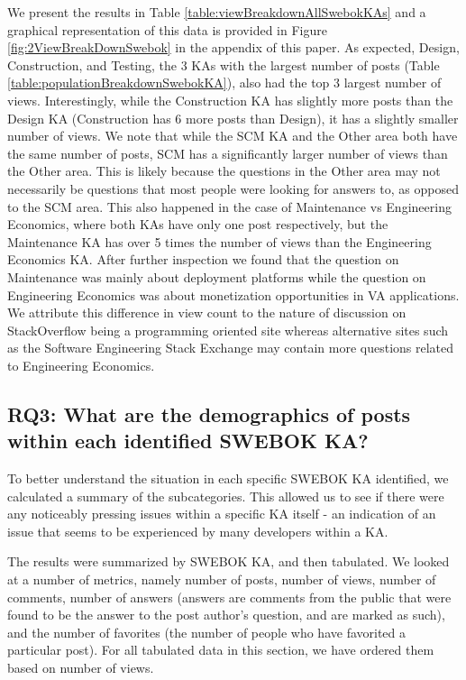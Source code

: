\documentclass{sigchi}
\begin{document}
We present the results in Table \ref{table:viewBreakdownAllSwebokKAs} and a graphical representation of this data is provided in Figure \ref{fig:2ViewBreakDownSwebok} in the appendix of this paper. As expected, Design, Construction, and Testing, the 3 KAs with the largest number of posts (Table \ref{table:populationBreakdownSwebokKA}), also had the top 3 largest number of views. Interestingly, while the Construction KA has slightly more posts than the Design KA (Construction has 6 more posts than Design), it has a slightly smaller number of views. We note that while the SCM KA and the Other area both have the same number of posts, SCM has a significantly larger number of views than the Other area. This is likely because the questions in the Other area may not necessarily be questions that most people were looking for answers to, as opposed to the SCM area. This also happened in the case of Maintenance vs Engineering Economics, where both KAs have only one post respectively, but the Maintenance KA has over 5 times the number of views than the Engineering Economics KA. After further inspection we found that the question on Maintenance was mainly about deployment platforms while the question on Engineering Economics was about monetization opportunities in VA applications. We attribute this difference in view count to the nature of discussion on StackOverflow being a programming oriented site whereas alternative sites such as the Software Engineering Stack Exchange may contain more questions related to Engineering Economics.

\subsection{RQ3: What are the demographics of posts within each identified SWEBOK KA?}
To better understand the situation in each specific SWEBOK KA identified, we calculated a summary of the subcategories. This allowed us to see if there were any noticeably pressing issues within a specific KA itself - an indication of an issue that seems to be experienced by many developers within a KA.

The results were summarized by SWEBOK KA, and then tabulated. We looked at a number of metrics, namely number of posts, number of views, number of comments, number of answers (answers are comments from the public that were found to be the answer to the post author's question, and are marked as such), and the number of favorites (the number of people who have favorited a particular post). For all tabulated data in this section, we have ordered them based on number of views.
\end{document}
